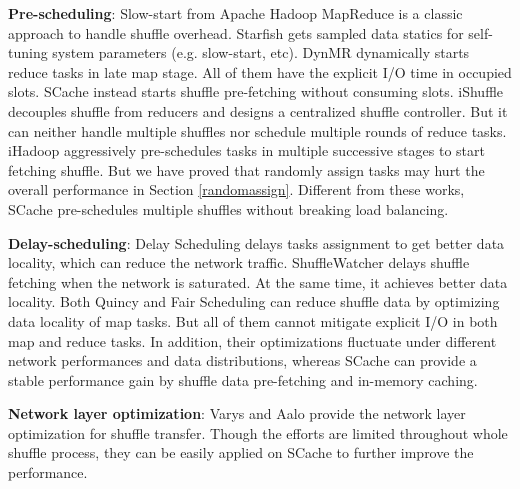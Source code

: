 \textbf{Pre-scheduling}: Slow-start from Apache Hadoop MapReduce is a classic approach to handle shuffle overhead. 
Starfish \cite{starfish} gets sampled data statics for self-tuning system parameters (e.g. slow-start, etc). 
DynMR \cite{dynmr} dynamically starts reduce tasks in late map stage. 
All of them have the explicit I/O time in occupied slots. 
SCache instead starts shuffle pre-fetching without consuming slots. 
iShuffle \cite{guo2017ishuffle} decouples shuffle from reducers and designs a centralized shuffle controller. 
But it can neither handle multiple shuffles nor schedule multiple rounds of reduce tasks. 
iHadoop \cite{ihadoop} aggressively pre-schedules tasks in multiple successive stages to start fetching shuffle. 
But we have proved that randomly assign tasks may hurt the overall performance in Section \ref{randomassign}. 
Different from these works, SCache pre-schedules multiple shuffles without breaking load balancing. 

\textbf{Delay-scheduling}: Delay Scheduling \cite{delay} delays tasks assignment to get better data locality, which can reduce the network traffic. 
ShuffleWatcher \cite{shufflewatcher} delays shuffle fetching when the network is saturated. 
At the same time, it achieves better data locality. 
Both Quincy \cite{quincy} and Fair Scheduling \cite{preemptive} can reduce shuffle data by optimizing data locality of map tasks. 
But all of them cannot mitigate explicit I/O in both map and reduce tasks. 
In addition, their optimizations fluctuate under different network performances and data distributions, whereas SCache can provide a stable performance gain by shuffle data pre-fetching and in-memory caching.

\textbf{Network layer optimization}: Varys \cite{varys} and Aalo \cite{aalo} provide the network layer optimization for shuffle transfer. 
Though the efforts are limited throughout whole shuffle process, they can be easily applied on SCache to further improve the performance.